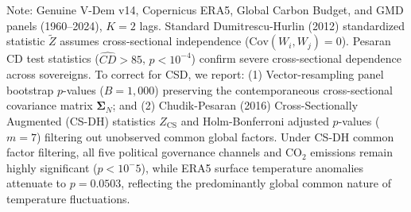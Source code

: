 \begin{table}[ht]
\centering
\small
\caption{Heterogeneous Panel Granger Non-Causality Tests under Cross-Sectional Dependence (CSD): Standard DH (2012), Vector-Resampling CSD Bootstrap ($B=1,000$), and Cross-Sectionally Augmented (CS-DH) Common Factor Tests}
\label{tab:dh_results}
\begin{flushleft}
\footnotesize Note: Genuine V-Dem v14, Copernicus ERA5, Global Carbon Budget, and GMD panels (1960--2024), $K=2$ lags. Standard Dumitrescu-Hurlin (2012) standardized statistic $\tilde{Z}$ assumes cross-sectional independence ($\text{Cov}(W_i, W_j)=0$). Pesaran CD test statistics ($\hat{CD} > 85$, $p < 10^{-4}$) confirm severe cross-sectional dependence across sovereigns. To correct for CSD, we report: (1) Vector-resampling panel bootstrap $p$-values ($B=1,000$) preserving the contemporaneous cross-sectional covariance matrix $\boldsymbol{\Sigma}_N$; and (2) Chudik-Pesaran (2016) Cross-Sectionally Augmented (CS-DH) statistics $Z_{\text{CS}}$ and Holm-Bonferroni adjusted $p$-values ($m=7$) filtering out unobserved common global factors. Under CS-DH common factor filtering, all five political governance channels and CO$_2$ emissions remain highly significant ($p < 10^-5$), while ERA5 surface temperature anomalies attenuate to $p = 0.0503$, reflecting the predominantly global common nature of temperature fluctuations.
\end{flushleft}
\end{table}